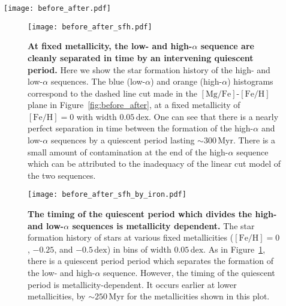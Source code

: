 \documentclass[linenumbers, twocolumn]{aastex631}
\newcommand{\Gyr}{\ensuremath{\textrm{Gyr}}}
\newcommand{\Myr}{\ensuremath{\textrm{Myr}}}
\newcommand{\FeH}{\ensuremath{[\textrm{Fe}/\textrm{H}]}}
\newcommand{\MgFe}{\ensuremath{[\textrm{Mg}/\textrm{Fe}]}}
\newcommand{\tform}{\ensuremath{t_{\textrm{form}}}}
\newcommand{\dex}{\ensuremath{\textrm{dex}}}
\begin{document}
\begin{figure*}
  \centering
  \texttt{[image: before\_after.pdf]}
  \caption{\textbf{The high-$\alpha$ sequence forms before the merger, the low-$\alpha$ sequence forms after the merger.} This plot shows the sequence of events leading to the build-up of the low- and high-$\alpha$ sequences for our fiducial bimodal simulation. We have separated the high- and low-$\alpha$ sequences by a dashed line at $-0.1\FeH + 0.31$, which was chosen by eye to lie in the trough. The left panel shows all star particles in our solar neighborhood cut. The middle left panel shows the star particles that form before the merger ($\tform < 1.5\,\Gyr$), which form a weak sequence of star particles at the lowest \FeH and highest \MgFe. The middle right panel shows the star particles that form during the starburst ($1.5\,\Gyr < \tform < 2.5\,\Gyr$). These star particles form the portion of the high-$\alpha$ sequence closest to the trough, and the density of star particless is higher than those that form before. The right panel shows the star particles which form after the merger ($\tform > 2.5\,\Gyr$). These star particles form almost entirely below the trough.}
  \label{fig:before_after}
\end{figure*}

\begin{figure}
  \centering
  \texttt{[image: before\_after\_sfh.pdf]}
  \caption{\textbf{At fixed metallicity, the low- and high-$\alpha$ sequence are cleanly separated in time by an intervening quiescent period.} Here we show the star formation history of the high- and low-$\alpha$ sequences. The blue (low-$\alpha$) and orange (high-$\alpha$) histograms correspond to the dashed line cut made in the \MgFe{}-\FeH{} plane in Figure~\ref{fig:before_after}, at a fixed metallicity of $\FeH=0$ with width $0.05\,\dex$. One can see that there is a nearly perfect separation in time between the formation of the high-$\alpha$ and low-$\alpha$ sequences by a quiescent period lasting $\sim300\,\Myr$. There is a small amount of contamination at the end of the high-$\alpha$ sequence which can be attributed to the inadequacy of the linear cut model of the two sequences.}
  \label{fig:before_after_sfh}
\end{figure}

\begin{figure}
  \centering
  \texttt{[image: before\_after\_sfh\_by\_iron.pdf]}
  \caption{\textbf{The timing of the quiescent period which divides the high- and low-$\alpha$ sequences is metallicity dependent.} The star formation history of stars at various fixed metallicities ($\FeH=0$, $-0.25$, and $-0.5\,\textrm{dex}$) in bins of width $0.05\,\dex$. As in Figure~\ref{fig:before_after_sfh}, there is a quiescent period period which separates the formation of the low- and high-$\alpha$ sequence. However, the timing of the quiescent period is metallicity-dependent. It occurs earlier at lower metallicities, by $\sim250\,\Myr$ for the metallicities shown in this plot.}
  \label{fig:before_after_sfh_by_iron}
\end{figure}
\end{document}
